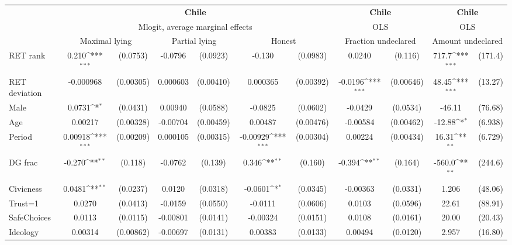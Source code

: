 \def\sym#1{\ifmmode^{#1}\else\(^{#1}\)\fi}
\begin{tabular}{l|cccccc|cc|cc}
\hline\hline
&\multicolumn{6}{c|}{\bf Chile}&\multicolumn{2}{c|}{\bf Chile}&\multicolumn{2}{c}{\bf Chile}\\ &\multicolumn{6}{c|}{Mlogit, average marginal effects }&\multicolumn{2}{c|}{OLS}&\multicolumn{2}{c}{OLS}\\
                &\multicolumn{2}{c}{Maximal lying}&\multicolumn{2}{c}{Partial lying}&\multicolumn{2}{c}{Honest}  &\multicolumn{2}{c}{Fraction undeclared}&\multicolumn{2}{c}{Amount undeclared}\\
\hline
RET rank        &    0.210\sym{***}& (0.0753)&  -0.0796         & (0.0923)&   -0.130         & (0.0983)&   0.0240         &  (0.116)&    717.7\sym{***}&  (171.4)\\
RET deviation   &-0.000968         &(0.00305)& 0.000603         &(0.00410)& 0.000365         &(0.00392)&  -0.0196\sym{***}&(0.00646)&    48.45\sym{***}&  (13.27)\\
Male            &   0.0731\sym{*}  & (0.0431)&  0.00940         & (0.0588)&  -0.0825         & (0.0602)&  -0.0429         & (0.0534)&   -46.11         &  (76.68)\\
Age             &  0.00217         &(0.00328)& -0.00704         &(0.00459)&  0.00487         &(0.00476)& -0.00584         &(0.00462)&   -12.88\sym{*}  &  (6.938)\\
Period          &  0.00918\sym{***}&(0.00209)& 0.000105         &(0.00315)& -0.00929\sym{***}&(0.00304)&  0.00224         &(0.00434)&    16.31\sym{**} &  (6.729)\\
DG frac         &   -0.270\sym{**} &  (0.118)&  -0.0762         &  (0.139)&    0.346\sym{**} &  (0.160)&   -0.394\sym{**} &  (0.164)&   -560.0\sym{**} &  (244.6)\\
Civicness       &   0.0481\sym{**} & (0.0237)&   0.0120         & (0.0318)&  -0.0601\sym{*}  & (0.0345)& -0.00363         & (0.0331)&    1.206         &  (48.06)\\
Trust=1         &   0.0270         & (0.0413)&  -0.0159         & (0.0550)&  -0.0111         & (0.0606)&   0.0103         & (0.0596)&    22.61         &  (88.91)\\
SafeChoices     &   0.0113         & (0.0115)& -0.00801         & (0.0141)& -0.00324         & (0.0151)&   0.0108         & (0.0161)&    20.00         &  (20.43)\\
Ideology        &  0.00314         &(0.00862)& -0.00697         & (0.0131)&  0.00383         & (0.0133)&  0.00494         & (0.0120)&    2.957         &  (16.80)\\

\end{tabular}
